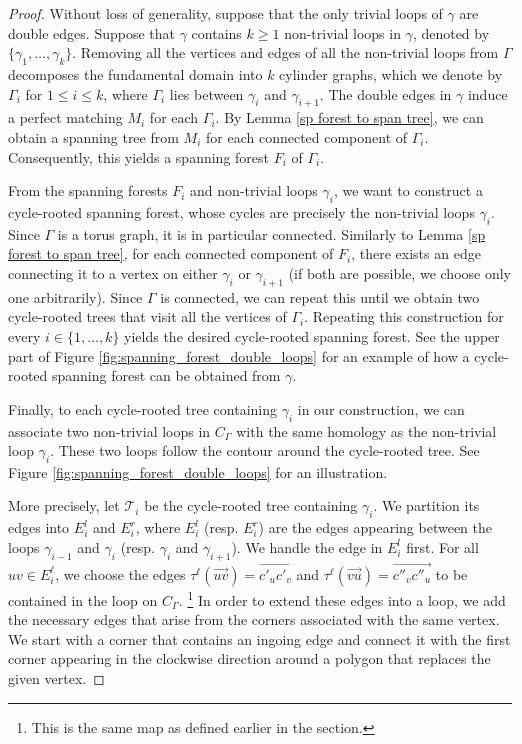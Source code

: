 \documentclass[12pt,a4paper]{article}
\theoremstyle{definition}
\begin{document}
\begin{proof}
    Without loss of generality, suppose that the only trivial loops of $\gamma$ are double edges. Suppose that $\gamma$ contains $k \geq 1$ non-trivial loops in $\gamma$, denoted by $\{\gamma_1, \dots, \gamma_k\}$. Removing all the vertices and edges of all the non-trivial loops from $\Gamma$ decomposes the fundamental domain into $k$ cylinder graphs, which we denote by $\Gamma_i$ for $1 \leq i \leq k$, where $\Gamma_i$ lies between $\gamma_i$ and $\gamma_{i+1}$. The double edges in $\gamma$ induce a perfect matching $M_i$ for each $\Gamma_i$. By Lemma \ref{sp forest to span tree}, we can obtain a spanning tree from $M_i$ for each connected component of $\Gamma_i$. Consequently, this yields a spanning forest $F_i$ of $\Gamma_i$.

    From the spanning forests $F_i$ and non-trivial loops $\gamma_i$, we want to construct a cycle-rooted spanning forest, whose cycles are precisely the non-trivial loops $\gamma_i$.
    Since $\Gamma$ is a torus graph, it is in particular connected. Similarly to Lemma \ref{sp forest to span tree}, for each connected component of $F_i$, there exists an edge connecting it to a vertex on either $\gamma_i$ or $\gamma_{i+1}$ (if both are possible, we choose only one arbitrarily). Since $\Gamma$ is connected, we can repeat this until we obtain two cycle-rooted trees that visit all the vertices of $\Gamma_i$. Repeating this construction for every $i \in \{1, \dots, k\}$ yields the desired cycle-rooted spanning forest. See the upper part of Figure \ref{fig:spanning_forest_double_loops} for an example of how a cycle-rooted spanning forest can be obtained from $\gamma$.

    Finally, to each cycle-rooted tree containing $\gamma_i$ in our construction, we can associate two non-trivial loops in $C_{\Gamma}$ with the same homology as the non-trivial loop $\gamma_i$. These two loops follow the contour around the cycle-rooted tree. See Figure \ref{fig:spanning_forest_double_loops} for an illustration.
    
    More precisely, let $\mathcal{T}_i$ be the cycle-rooted tree containing $\gamma_i$. We partition its edges into $E^l_i$ and $E^r_i$, where $E^l_i$ (resp. $E^r_i$) are the edges appearing between the loops $\gamma_{i-1}$ and $\gamma_i$ (resp. $\gamma_i$ and $\gamma_{i+1}$). We handle the edge in $E^l_i$ first.
    For all $uv \in E^\ell_i$, we choose the edges $\tau^\ell(\overrightarrow{uv}) = \overrightarrow{c'_u c'_v}$ and $\tau^\ell(\overrightarrow{vu}) = \overrightarrow{c''_v c''_u}$ to be contained in the loop on $C_\Gamma$. \footnote{This is the same map as defined earlier in the section.} In order to extend these edges into a loop, we add the necessary edges that arise from the corners associated with the same vertex. We start with a corner that contains an ingoing edge and connect it with the first corner appearing in the clockwise direction around a polygon that replaces the given vertex.
\end{proof}
\end{document}
